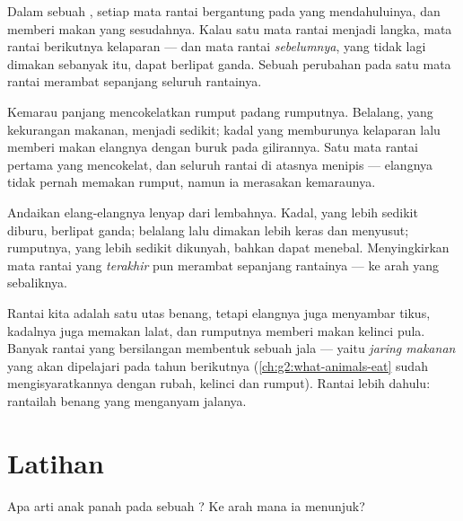 \begin{proposition}\label{prop:g3:food-chains:depend}
Dalam sebuah , setiap mata rantai bergantung pada yang
mendahuluinya, dan memberi makan yang sesudahnya. Kalau satu mata
rantai menjadi langka, mata rantai berikutnya kelaparan --- dan mata
rantai \emph{sebelumnya}, yang tidak lagi dimakan sebanyak itu, dapat
berlipat ganda. Sebuah perubahan pada satu mata rantai merambat
sepanjang seluruh rantainya.
\end{proposition}
\admitted

\begin{example}\label{ex:g3:food-chains:dry}
Kemarau panjang mencokelatkan rumput padang rumputnya. Belalang, yang
kekurangan makanan, menjadi sedikit; kadal yang memburunya kelaparan
lalu memberi makan elangnya dengan buruk pada gilirannya. Satu mata
rantai pertama yang mencokelat, dan seluruh rantai di atasnya menipis
--- elangnya tidak pernah memakan rumput, namun ia merasakan
kemaraunya.
\end{example}

\begin{example}\label{ex:g3:food-chains:hunter}
Andaikan elang-elangnya lenyap dari lembahnya. Kadal, yang lebih
sedikit diburu, berlipat ganda; belalang lalu dimakan lebih keras dan
menyusut; rumputnya, yang lebih sedikit dikunyah, bahkan dapat
menebal. Menyingkirkan mata rantai yang \emph{terakhir} pun merambat
sepanjang rantainya --- ke arah yang sebaliknya.
\end{example}

\begin{remark}\label{rem:g3:food-chains:web}
Rantai kita adalah satu utas benang, tetapi elangnya juga menyambar
tikus, kadalnya juga memakan lalat, dan rumputnya memberi makan
kelinci pula. Banyak rantai yang bersilangan membentuk sebuah jala ---
yaitu \emph{jaring makanan} yang akan dipelajari pada tahun berikutnya
(\cref{ch:g2:what-animals-eat} sudah mengisyaratkannya dengan rubah,
kelinci dan rumput). Rantai lebih dahulu: rantailah benang yang
menganyam jalanya.
\end{remark}

\section{Latihan}

\begin{exercise}[$\star$]\label{exo:g3:food-chains:1}
Apa arti anak panah pada sebuah ? Ke arah mana ia
menunjuk?
\end{exercise}

